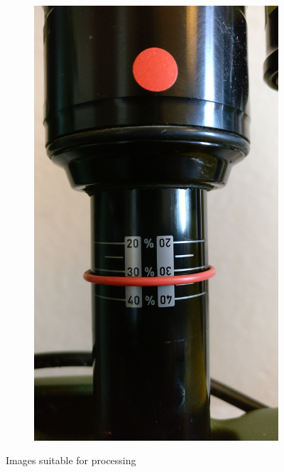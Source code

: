 \begin{figure}[h!]
\begin{subfigure}[t]{0.5\textwidth}
					\includegraphics[scale=0.04]{../images/results/150_rs.jpg}
				\end{subfigure}
				\caption{Images suitable for processing}
				\label{fig:application_images}
			\end{figure}
